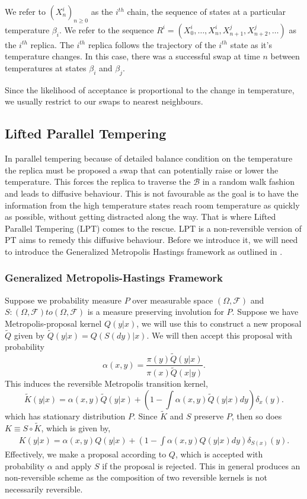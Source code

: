 \documentclass[12pt]{article}
\begin{document}
We refer to $(X_n^{i})_{n\geq0}$ as the $i^{th}$ chain, the sequence of states at a particular temperature $\beta_i$. We refer to the sequence $R^i=(X_0^{i},\dots,X_n^i,X_{n+1}^{j},X_{n+2}^{j},\dots)$ as the $i^{th}$ replica. The $i^{th}$ replica follows the trajectory of the $i^{th}$ state as it's temperature changes. In this case, there was a successful swap at time $n$ between temperatures at states $\beta_i$ and $\beta_j$.  

Since the likelihood of acceptance is proportional to the change in temperature, we usually restrict to our swaps to nearest neighbours. 
\subsection{Lifted Parallel Tempering}
In parallel tempering because of detailed balance condition on the temperature the replica must be proposed a swap that can potentially raise or lower the temperature. This  forces the replica to traverse the $\mathcal{B}$ in a random walk fashion and leads to diffusive behaviour. This is not favourable as the goal is to have the information from the high temperature states reach room temperature as quickly as possible, without getting distracted along the way. That is where Lifted Parallel Tempering (LPT) comes to the rescue. LPT is a non-reversible version of PT aims to remedy this diffusive behaviour. Before we introduce it, we will need to introduce the Generalized Metropolis Hastings framework as outlined in \cite{wu_irreversible_2017}.

\subsubsection{Generalized Metropolis-Hastings Framework}
Suppose we probability measure $P$ over measurable space $(\Omega,\mathcal{F})$ and $S:(\Omega,\mathcal{F})to (\Omega,\mathcal{F})$ is a measure preserving involution for $P$. Suppose we have Metropolis-proposal kernel $Q(y|x)$, we will use this to construct a new proposal $\tilde{Q}$ given by $\tilde{Q}(y|x)=Q(S(dy)|x)$. We will then accept this proposal with probability 
\[\alpha(x,y)=\frac{\pi(y)\tilde{Q}(y|x)}{\pi(x)\tilde{Q}(x|y)}.\]
This induces the reversible Metropolis transition kernel, 
\[\tilde{K}(y|x)=\alpha(x,y)\tilde{Q}(y|x)+\left(1-\int\alpha(x,y)\tilde{Q}(y|x)dy\right)\delta_x(y).\]
which has stationary distribution $P$. Since $\tilde{K}$ and $S$ preserve $P$, then so does $K\equiv S\circ \tilde{K}$, which is given by,
\begin{align*}
K(y|x)=\alpha(x,y)Q(y|x)+\left(1-\int\alpha(x,y)Q(y|x)dy\right)\delta_{S(x)}(y).
\end{align*}
Effectively, we make a proposal according to $Q$, which is accepted with probability $\alpha$ and apply $S$ if the proposal is rejected. This in general produces an non-reversible scheme as the composition of two reversible kernels is not necessarily reversible.
\end{document}

